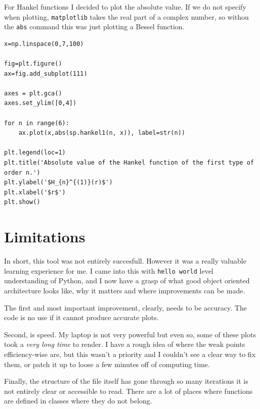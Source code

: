%
For Hankel functions I decided to plot the absolute value. If we do not specify when plotting, \verb!matplotlib! takes the real part of a complex number, so withou the \verb!abs! command this was just plotting a Bessel function.
%
\begin{lstlisting}[caption={Plot of hankel functions of integer order},label={lst:hankel_int_no}]
x=np.linspace(0,7,100)

fig=plt.figure()
ax=fig.add_subplot(111)

axes = plt.gca()
axes.set_ylim([0,4])

for n in range(6):
    ax.plot(x,abs(sp.hankel1(n, x)), label=str(n))

plt.legend(loc=1)
plt.title('Absolute value of the Hankel function of the first type of order n.')
plt.ylabel('$H_{n}^{(1)}(r)$')
plt.xlabel('$r$')
plt.show()\end{lstlisting}\par

\section{Limitations}

In short, this tool was not entirely succesfull. However it was a really valuable learning experience for me. I came into this with \verb!hello world! level understanding of Python, and I now have a grasp of what good object oriented architecture looks like, why it matters and where improvements can be made.

The first and most important improvement, clearly, needs to be accuracy. The code is no use if it cannot produce accurate plots.

Second, is speed. My laptop is not very powerful but even so, some of these plots took a \emph{very long time} to render. I have a rough idea of where the weak points efficiency-wise are, but this wasn't a priority and I couldn't see a clear way to fix them, or patch it up to loose a few minutes off of computing time.

Finally, the structure of the file itself has gone through so many iterations it is not entirely clear or accessible to read. There are a lot of places where functions are defined in classes where they do not belong.
